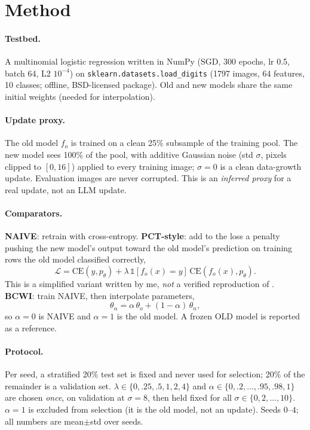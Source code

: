 \documentclass[acmsmall,screen]{acmart}
\begin{document}
\section{Method}
\paragraph{Testbed.} A multinomial logistic regression written in NumPy (SGD, 300 epochs, lr 0.5, batch 64, L2 $10^{-4}$) on \texttt{sklearn.datasets.load\_digits} (1797 images, 64 features, 10 classes; offline, BSD-licensed package). Old and new models share the same initial weights (needed for interpolation).
\paragraph{Update proxy.} The old model $f_o$ is trained on a clean 25\% subsample of the training pool. The new model sees 100\% of the pool, with additive Gaussian noise (std $\sigma$, pixels clipped to $[0,16]$) applied to every training image; $\sigma{=}0$ is a clean data-growth update. Evaluation images are never corrupted. This is an \emph{inferred proxy} for a real update, not an LLM update.
\paragraph{Comparators.}
\textbf{NAIVE}: retrain with cross-entropy. \textbf{PCT-style}: add to the loss a penalty pushing the new model's output toward the old model's prediction on training rows the old model classified correctly,
\begin{equation}
\mathcal{L}=\mathrm{CE}(y,p_\theta)+\lambda\,\mathbb{1}[f_o(x)=y]\,\mathrm{CE}(f_o(x),p_\theta).
\label{eq:pct}
\end{equation}
This is a simplified variant written by me, \emph{not} a verified reproduction of \citet{yan2021positive}. \textbf{BCWI}: train NAIVE, then interpolate parameters,
\begin{equation}
\theta_{\alpha}=\alpha\,\theta_o+(1-\alpha)\,\theta_n,
\label{eq:bcwi}
\end{equation}
so $\alpha{=}0$ is NAIVE and $\alpha{=}1$ is the old model. A frozen OLD model is reported as a reference.
\paragraph{Protocol.} Per seed, a stratified 20\% test set is fixed and never used for selection; 20\% of the remainder is a validation set. $\lambda\in\{0,.25,.5,1,2,4\}$ and $\alpha\in\{0,.2,\dots,.95,.98,1\}$ are chosen \emph{once}, on validation at $\sigma{=}8$, then held fixed for all $\sigma\in\{0,2,\dots,10\}$. $\alpha{=}1$ is excluded from selection (it is the old model, not an update). Seeds $0$--$4$; all numbers are mean$\pm$std over seeds.
\end{document}
